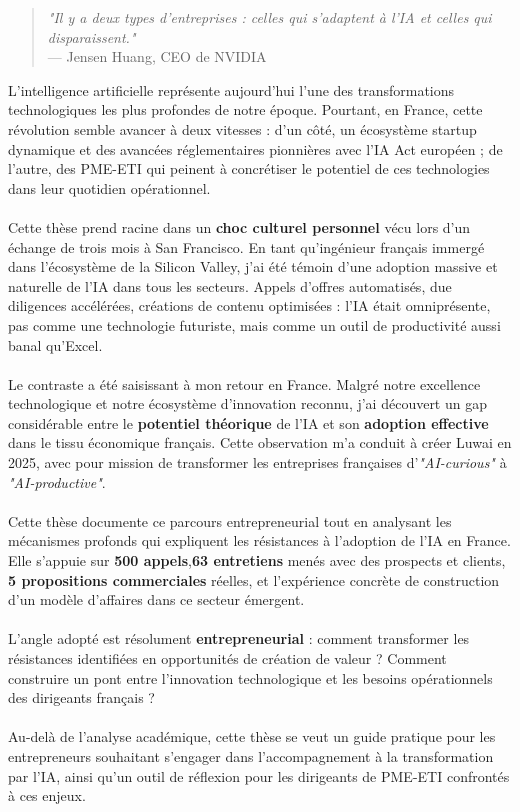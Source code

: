 \begin{quote}
\textit{"Il y a deux types d'entreprises : celles qui s'adaptent à l'IA et celles qui disparaissent."} \\
--- Jensen Huang, CEO de NVIDIA
\end{quote}
\medskip
L'intelligence artificielle représente aujourd'hui l'une des transformations technologiques les plus profondes de notre époque. Pourtant, en France, cette révolution semble avancer à deux vitesses : d'un côté, un écosystème startup dynamique et des avancées réglementaires pionnières avec l'IA Act européen ; de l'autre, des PME-ETI qui peinent à concrétiser le potentiel de ces technologies dans leur quotidien opérationnel.
\\\\
Cette thèse prend racine dans un \textbf{choc culturel personnel} vécu lors d'un échange de trois mois à San Francisco. En tant qu'ingénieur français immergé dans l'écosystème de la Silicon Valley, j'ai été témoin d'une adoption massive et naturelle de l'IA dans tous les secteurs. Appels d'offres automatisés, due diligences accélérées, créations de contenu optimisées : l'IA était omniprésente, pas comme une technologie futuriste, mais comme un outil de productivité aussi banal qu'Excel.
\\\\
Le contraste a été saisissant à mon retour en France. Malgré notre excellence technologique et notre écosystème d'innovation reconnu, j'ai découvert un gap considérable entre le \textbf{potentiel théorique} de l'IA et son \textbf{adoption effective} dans le tissu économique français. Cette observation m'a conduit à créer Luwai en 2025, avec pour mission de transformer les entreprises françaises d'\textit{"AI-curious"} à \textit{"AI-productive"}.
\\\\
Cette thèse documente ce parcours entrepreneurial tout en analysant les mécanismes profonds qui expliquent les résistances à l'adoption de l'IA en France. Elle s'appuie sur \textbf{500 appels},\textbf{63 entretiens} menés avec des prospects et clients, \textbf{5 propositions commerciales} réelles, et l'expérience concrète de construction d'un modèle d'affaires dans ce secteur émergent.
\\\\
L'angle adopté est résolument \textbf{entrepreneurial} : comment transformer les résistances identifiées en opportunités de création de valeur ? Comment construire un pont entre l'innovation technologique et les besoins opérationnels des dirigeants français ?
\\\\
Au-delà de l'analyse académique, cette thèse se veut un guide pratique pour les entrepreneurs souhaitant s'engager dans l'accompagnement à la transformation par l'IA, ainsi qu'un outil de réflexion pour les dirigeants de PME-ETI confrontés à ces enjeux.
